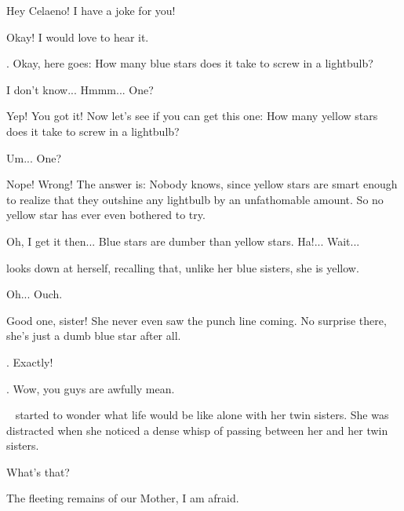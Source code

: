 \documentclass[main.tex]{subfiles}
\begin{document}
\par \Taygete Hey Celaeno!  I have a joke for you!

\par \Celaeno Okay!  I would love to hear it.

\par \Taygete. Okay, here goes:  How many blue stars does it take to screw in a lightbulb?

\par \Celaeno I don't know... Hmmm... One?

\par \Taygete Yep!  You got it!  Now let's see if you can get this one:  How many yellow stars does it take to screw in a lightbulb?

\par \Celaeno Um... One?

\par \Taygete Nope!  Wrong!  The answer is:  Nobody knows, since yellow stars are smart enough to realize that they outshine any lightbulb by an unfathomable amount.  So no yellow star has ever even bothered to try.

\par \Celaeno Oh, I get it then...  Blue stars are dumber than yellow stars.  Ha!...  Wait...

\par \nar \rmcelaeno looks down at herself, recalling that, unlike her blue sisters, she is yellow.

\par \Celaeno Oh...  Ouch.

\par \Alcyone Good one, sister!  She never even saw the punch line coming.  No surprise there, she's just a dumb blue star after all.

\par \Taygete. Exactly!

\par \Celaeno. Wow, you guys are awfully mean.

\par \nar \rmcelaeno~ started to wonder what life would be like alone with her twin sisters.  She was distracted when she noticed a dense whisp of \Pleione passing between her and her twin sisters.  

\par \Celaeno What's that?

\par \Maia The fleeting remains of our Mother, I am afraid.
\end{document}
